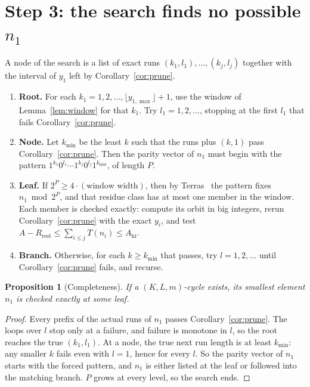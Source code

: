 \documentclass[11pt]{amsart}
\newtheorem{proposition}[theorem]{Proposition}
\theoremstyle{definition}
\theoremstyle{remark}
\newcommand{\Ahi}{A_{\mathrm{hi}}}
\begin{document}
\section{Step 3: the search finds no possible \texorpdfstring{$n_1$}{n1}}\label{sec:search}

A node of the search is a list of exact runs $(k_1,l_1),\dots,(k_j,l_j)$ together with the
interval of $y_1$ left by Corollary~\ref{cor:prune}.

\begin{enumerate}[label=\arabic*.]
  \item \textbf{Root.} For each $k_1 = 1, 2, \dots, \lfloor y_{1,\max}\rfloor + 1$, use the window of
  Lemma~\ref{lem:window} for that $k_1$. Try $l_1 = 1, 2, \dots$, stopping at the first $l_1$ that
  fails Corollary~\ref{cor:prune}.
  \item \textbf{Node.} Let $k_{\min}$ be the least $k$ such that the runs plus $(k, 1)$ pass
  Corollary~\ref{cor:prune}. Then the parity vector of $n_1$ must begin with the pattern
  $1^{k_1}0^{l_1}\cdots 1^{k_j}0^{l_j}1^{k_{\min}}$, of length $P$.
  \item \textbf{Leaf.} If $2^{P} \ge 4\cdot(\text{window width})$, then by Terras~\cite{terras} the pattern
  fixes $n_1 \bmod 2^{P}$, and that residue class has at most one member in the window. Each
  member is checked exactly: compute its orbit in big integers, rerun Corollary~\ref{cor:prune}
  with the exact $y_i$, and test $A - R_{\mathrm{rest}} \le \sum_{i \le j} T(n_i) \le \Ahi$.
  \item \textbf{Branch.} Otherwise, for each $k \ge k_{\min}$ that passes, try $l = 1, 2, \dots$
  until Corollary~\ref{cor:prune} fails, and recurse.
\end{enumerate}

\begin{proposition}[Completeness]\label{prop:complete}
If a $(K, L, m)$-cycle exists, its smallest element $n_1$ is checked exactly at some leaf.
\end{proposition}

\begin{proof}
Every prefix of the actual runs of $n_1$ passes Corollary~\ref{cor:prune}. The loops over $l$
stop only at a failure, and failure is monotone in $l$, so the root reaches the true
$(k_1, l_1)$. At a node, the true next run length is at least $k_{\min}$: any smaller $k$ fails
even with $l = 1$, hence for every $l$. So the parity vector of $n_1$ starts with the forced
pattern, and $n_1$ is either listed at the leaf or followed into the matching branch. $P$ grows
at every level, so the search ends.
\end{proof}
\end{document}
